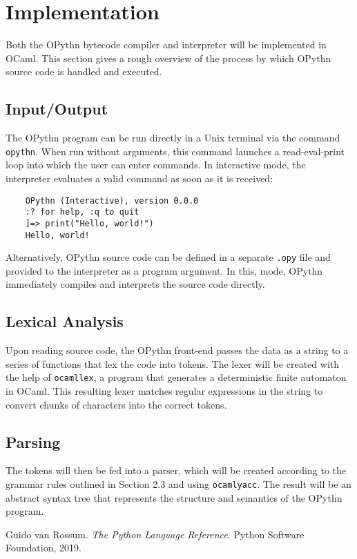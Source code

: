 \documentclass[11pt, twoside]{article}
\begin{document}
\section{Implementation}
Both the OPythn bytecode compiler and interpreter will be implemented in OCaml. This section gives a rough overview of the process by which OPythn source code is handled and executed.
    \subsection{Input/Output}
    The OPythn program can be run directly in a Unix terminal via the command \texttt{opythn}. When run without arguments, this command launches a read-eval-print loop into which the user can enter commands. In interactive mode, the interpreter evaluates a valid command as soon as it is received:
    \begin{lstlisting}
    OPythn (Interactive), version 0.0.0
    :? for help, :q to quit
    ]=> print("Hello, world!")
    Hello, world!
    \end{lstlisting}
    Alternatively, OPythn source code can be defined in a separate \texttt{.opy} file and provided to the interpreter as a program argument. In this, mode, OPythn immediately compiles and interprets the source code directly.
    \subsection{Lexical Analysis}
    Upon reading source code, the OPythn front-end passes the data as a string to a series of functions that lex the code into tokens. The lexer will be created with the help of \texttt{ocamllex}, a program that generates a deterministic finite automaton in OCaml. This resulting lexer matches regular expressions in the string to convert chunks of characters into the correct tokens. 
    \subsection{Parsing}
    The tokens will then be fed into a parser, which will be created according to the grammar rules outlined in Section 2.3 and using \texttt{ocamlyacc}. The result will be an abstract syntax tree that represents the structure and semantics of the OPythn program. 


\begin{thebibliography}{1}
     Guido van Rossum. \textit{The Python Language Reference}. Python Software Foundation, 2019.
\end{thebibliography}
\end{document}
